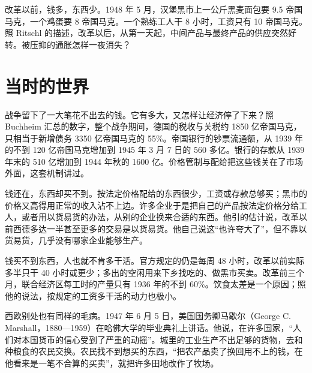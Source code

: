 改革以前，钱多，东西少。1948 年 5 月，汉堡黑市上一公斤黑麦面包要 9.5 帝国马克，一个鸡蛋要 8 帝国马克\cite{buchheim1988}。一个熟练工人干 8 小时，工资只有 10 帝国马克\cite{buchheim1988}。照 Ritschl 的描述，改革以后，从第一天起，中间产品与最终产品的供应突然好转\cite{ritschl1985}。被压抑的通胀怎样一夜消失？

\section{当时的世界}\label{sec:reconstruction-world}

战争留下了一大笔花不出去的钱。它有多大，又怎样让经济停了下来？照 Buchheim 汇总的数字，整个战争期间，德国的税收与关税约 1850 亿帝国马克，只相当于新增债务 3350 亿帝国马克的 55\%\cite{buchheim1988}。帝国银行的钞票流通额，从 1939 年的不到 120 亿帝国马克增加到 1945 年 3 月 7 日的 560 多亿\cite{buchheim1988}。银行的存款从 1939 年末的 510 亿增加到 1944 年秋的 1600 亿\cite{buchheim1988}。价格管制与配给把这些钱关在了市场外面，这套机制讲过。

钱还在，东西却买不到。按法定价格配给的东西很少，工资或存款总够买；黑市的价格又高得用正常的收入沾不上边\cite{buchheim1988}。许多企业于是把自己的产品按法定价格分给工人，或者用以货易货的办法，从别的企业换来合适的东西\cite{buchheim1988}。他引的估计说，改革以前西德多达一半甚至更多的交易是以货易货。他自己说这“也许夸大了”，但不靠以货易货，几乎没有哪家企业能够生产\cite{buchheim1988}。

钱买不到东西，人也就不肯多干活。官方规定的仍是每周 48 小时，改革以前实际多半只干 40 小时或更少；多出的空闲用来下乡找吃的、做黑市买卖\cite{buchheim1988}。改革前三个月，联合经济区每工时的产量只有 1936 年的不到 60\%\cite{buchheim1988}。饮食太差是一个原因；照他的说法，按规定的工资多干活的动力也极小\cite{buchheim1988}。

西欧别处也有同样的毛病。1947 年 6 月 5 日，美国国务卿马歇尔（George C. Marshall，1880—1959）在哈佛大学的毕业典礼上讲话\cite{marshall1947,loc35}。他说，在许多国家，“人们对本国货币的信心受到了严重的动摇”\cite{marshall1947}。城里的工业生产不出足够的货物，去和种粮食的农民交换\cite{marshall1947}。农民找不到想买的东西，“把农产品卖了换回用不上的钱，在他看来是一笔不合算的买卖”，就把许多田地改作了牧场\cite{marshall1947}。


